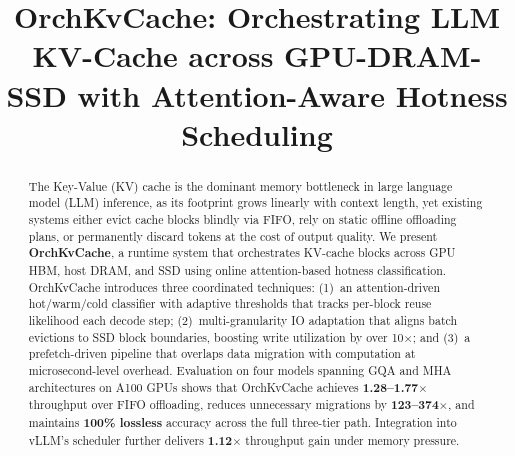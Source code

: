 \documentclass[conference]{IEEEtran}
\begin{document}
\title{OrchKvCache: Orchestrating LLM KV-Cache across GPU-DRAM-SSD with Attention-Aware Hotness Scheduling\\
}

\author{
\and
{}
}

\maketitle

\begin{abstract}
The Key-Value (KV) cache is the dominant memory bottleneck in large language model (LLM) inference, as its footprint grows linearly with context length, yet existing systems either evict cache blocks blindly via FIFO, rely on static offline offloading plans, or permanently discard tokens at the cost of output quality. We present \textbf{OrchKvCache}, a runtime system that orchestrates KV-cache blocks across GPU HBM, host DRAM, and SSD using online attention-based hotness classification. OrchKvCache introduces three coordinated techniques: (1)~an attention-driven hot/warm/cold classifier with adaptive thresholds that tracks per-block reuse likelihood each decode step; (2)~multi-granularity IO adaptation that aligns batch evictions to SSD block boundaries, boosting write utilization by over 10$\times$; and (3)~a prefetch-driven pipeline that overlaps data migration with computation at microsecond-level overhead. Evaluation on four models spanning GQA and MHA architectures on A100 GPUs shows that OrchKvCache achieves \textbf{1.28--1.77$\times$} throughput over FIFO offloading, reduces unnecessary migrations by \textbf{123--374$\times$}, and maintains \textbf{100\% lossless} accuracy across the full three-tier path. Integration into vLLM's scheduler further delivers \textbf{1.12$\times$} throughput gain under memory pressure.
\end{abstract}
\end{document}
